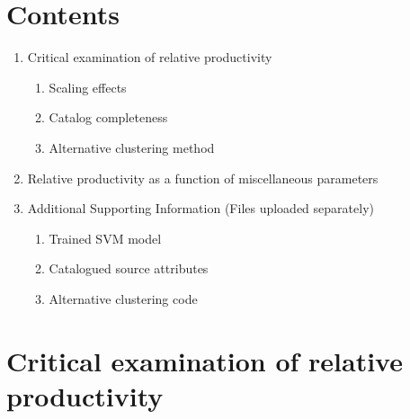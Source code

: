 \documentclass[draft]{agujournal}
\begin{document}

 

\large
\section*{Contents}
\begin{minipage}{.8\textwidth}

    \begin{enumerate}[label=\textbf{S\arabic*}]
    \item Critical examination of relative productivity\dotfill \pageref{sec:Critical}
    \begin{enumerate}[label*=\textbf{.\arabic*}]
    \setlength{\itemindent}{1.5em}
        \item Scaling effects\dotfill \pageref{sec:Critical}
        \item Catalog completeness\dotfill \pageref{sec:catalog}
        \item Alternative clustering method\dotfill \pageref{sec:alt}
    \end{enumerate}
    
    \item Relative productivity as a function of miscellaneous parameters \dotfill \pageref{sec:relative}
    \item{Additional Supporting Information (Files uploaded separately)}\dotfill \pageref{sec:additional}
    \begin{enumerate}[label*=\textbf{.\arabic*}]
    \setlength{\itemindent}{1.5em}
        \item Trained SVM  model\dotfill \pageref{sec:trained}
        \item Catalogued source attributes\dotfill \pageref{sec:source}
        \item Alternative clustering code\dotfill \pageref{sec:aftershock}
    \end{enumerate}
    \end{enumerate}
    
\end{minipage}

\section{Critical examination of relative productivity}
\label{sec:Critical}
\end{document}
